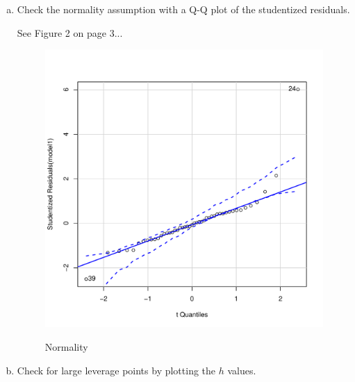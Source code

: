\documentclass[12pt,letterpaper]{article}
\begin{document}
\begin{enumerate}[(a)]
\newpage
	\item Check the normality assumption with a Q-Q plot of the studentized residuals. \vspace{.25cm}
		  
		See Figure 2 on page 3...
		\begin{figure}[h!]\centering
		\caption{\footnotesize Normality}\vspace{-1cm}
		\label{fig:b}
		\includegraphics[width=.85\textwidth]{b.pdf}\\
		\end{figure}
	
\item Check for large leverage points by plotting the $h$ values. \vspace{.25cm}
	  
	

\end{enumerate}
\end{document}
